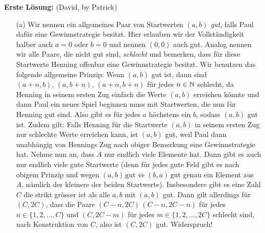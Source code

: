 \textbf{Erste Lösung:} (David, by Patrick)
\begin{enumerate}
    \item[(a)] Wir nennen ein allgemeines Paar von Startwerten $(a,b)$ \textit{gut}, falls Paul dafür eine Gewinnstrategie besitzt. Hier erlauben wir der Vollständigkeit halber auch $a=0$ oder $b=0$ und nennen $(0,0)$ auch gut. Analog nennen wir alle Paare, die nicht gut sind, \textit{schlecht} und bemerken, dass für diese Startwerte Henning offenbar eine Gewinnstrategie besitzt. Wir benutzen das folgende allgemeine Prinzip:
    \newline \newline
    Wenn $(a,b)$ gut ist, dann sind $(a+n,b), \, (a,b+n), \, (a+n,b+n)$ für jedes $n \in \mathbb{N}$ schlecht, da Henning in seinem ersten Zug einfach die Werte $(a,b)$ erreichen könnte und dann Paul ein neues Spiel beginnen muss mit Startwerten, die nun für Henning gut sind. Also gibt es für jedes $a$ höchstens ein $b$, sodass $(a,b)$ gut ist.
    \newline 
    Zudem gilt: Falls Henning für die Startwerte $(a,b)$ in seinem ersten Zug nur schlechte Werte erreichen kann, ist $(a,b)$ gut, weil Paul dann unabhängig von Hennings Zug nach obiger Bemerkung eine Gewinnstrategie hat.
    \newline
    \newline
    Nehme nun an, dass $A$ nur endlich viele Elemente hat. Dann gibt es auch nur endlich viele gute Startwerte (denn für jedes gute Feld gibt es nach obigem Prinzip und wegen $(a,b) \, \text{gut} \iff (b,a) \, \text{gut}$ genau ein Element aus $A$, nämlich der kleinere der beiden Startwerte). Insbesondere gibt es eine Zahl $C$ die strikt grösser ist als alle $a, b$ mit $(a,b)$ gut. Dann gilt allerdings für $(C,2C)$, dass die Paare $(C-n,2C) \, (C-n, 2C-n)$ für jedes $n \in \{1,2,\dots,C\}$ und $(C,2C-m)$ für jedes $m \in \{1,2,\dots, 2C \}$ schlecht sind, nach Konstruktion von $C$, also ist $(C,2C)$ gut. Widerspruch!
    

\end{enumerate}
